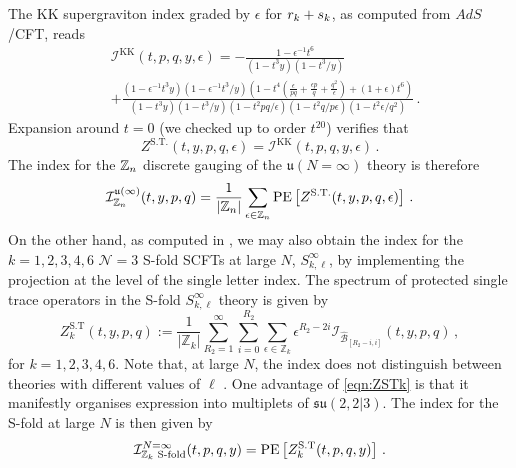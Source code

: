 \documentclass[main.tex]{subfiles}
\begin{document}
The KK supergraviton index graded by $\epsilon$ for $r_k+ s_k$, as computed from $AdS$/CFT, reads \cite{Imamura:2016abe}
\begin{equation}\label{eqn:LargeN}
\begin{aligned}
&\mathcal{I}^{\text{KK}}\left(t,p,q,y,\epsilon\right)=-\frac{1-\epsilon^{-1}t^6}{\left(1-t^3y\right)\left(1-t^3/y\right)}\\
&+\frac{\left(1-\epsilon^{-1}t^3y\right)\left(1-\epsilon^{-1}t^3/y\right)\left(1-t^4\left(\frac{\epsilon}{pq}+\frac{\epsilon p}{q}+\frac{q^2}{\epsilon}\right)+\left(1+\epsilon\right)t^6\right)}{\left(1-t^3y\right)\left(1-t^3/y\right)\left(1-t^2pq/\epsilon\right)\left(1-t^2q/p\epsilon\right)\left(1-t^2\epsilon/q^2\right)}\,.
\end{aligned}
\end{equation}
Expansion around $t=0$ (we checked up to order $t^{20}$) verifies that
\begin{equation}
Z^{\text{S.T.}}(t,y,p,q,\epsilon)=\mathcal{I}^{\text{KK}}\left(t,p,q,y,\epsilon\right)\,.
\end{equation}
The index for the $\mathbb{Z}_{n}$ discrete gauging of the $\mathfrak{u}(N=\infty)$ theory is therefore
\begin{equation}\label{eqn:largeNdis}
\mathcal{I}^{\mathfrak{u}(\infty)}_{\mathbb{Z}_{n}}(t,y,p,q)=\frac{1}{|\mathbb{Z}_{n}|}\sum_{\epsilon\in \mathbb{Z}_{n}}\operatorname{\mathrm{PE}}\left[Z^{\text{S.T.}}(t,y,p,q,\epsilon)\right]\,.
\end{equation}
On the other hand, as computed in \cite{Imamura:2016abe}, we may also obtain the index for the $k=1,2,3,4,6$ $\mathcal{N}=3$ S-fold SCFTs at large $N$, $S^{\infty}_{k,\ell}$, by implementing the projection at the level of the single letter index. The spectrum of protected single trace operators in the S-fold $S^{\infty}_{k,\ell}$ theory is given by
\begin{equation}\label{eqn:ZSTk}
Z^{\text{S.T}}_k(t,y,p,q):=\frac{1}{|\mathbb{Z}_k|}\sum_{R_2=1}^{\infty}\sum_{i=0}^{R_2}\sum_{\epsilon\in\mathbb{Z}_k}\epsilon^{R_2-2i}\mathcal{I}_{\hat{\mathcal{B}}_{[R_2-i,i]}}(t,y,p,q)\,,
\end{equation}
for $k=1,2,3,4,6$.
Note that, at large $N$, the index does not distinguish between theories with different values of $\ell$ \cite{Imamura:2016abe}.
One advantage of \eqref{eqn:ZSTk} is that it manifestly organises expression into multiplets of $\mathfrak{su}(2,2|3)$. The index for the S-fold at large $N$ is then given by
\begin{equation}
\mathcal{I}^{N=\infty}_{\mathbb{Z}_k\text{ S-fold}}(t,p,q,y)=\operatorname{\mathrm{PE}}\left[Z_k^{\text{S.T}}(t,p,q,y)\right]\,.
\end{equation}
\end{document}
